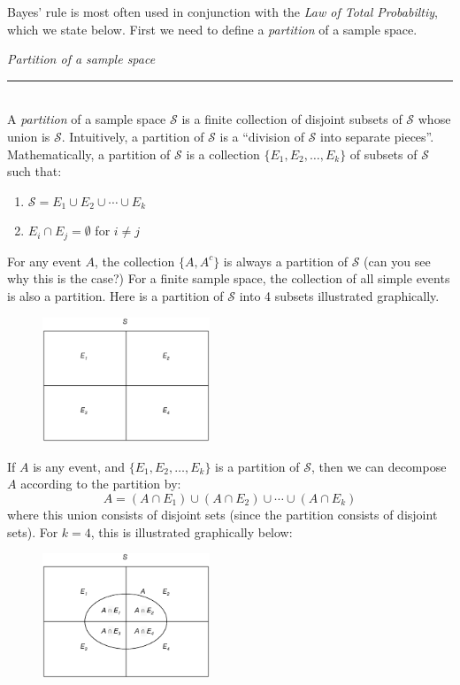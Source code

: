 \documentclass[12pt]{article}
\theoremstyle{definition}
\theoremstyle{remark}
\def\cals{{\mathcal S}}
\begin{document}
Bayes' rule is most often used in conjunction with the \emph{Law of Total Probabiltiy}, which we state below. First we need to define a \emph{partition} of a sample space.

\begin{framed}
\emph{Partition of a sample space}\\
  \rule{\dimexpr{}\fboxrule}{.1pt} \\
A \emph{partition} of a sample space $\cals$ is a finite collection of disjoint subsets of $\cals$ whose union is $\cals$. Intuitively, a partition of $\cals$ is a ``division of $\cals$ into separate pieces''. Mathematically, a partition of $\cals$ is a collection $\{E_1, E_2, \dots, E_k\}$ of subsets of $\cals$ such that:
\begin{enumerate}
\item $\cals = E_1 \cup E_2 \cup \cdots \cup E_k$
\item $E_i \cap E_j = \emptyset$ for $i \neq j$
\end{enumerate}
\end{framed}

For any event $A$, the collection $\{A, A^c\}$ is always a partition of $\cals$ (can you see why this is the case?) For a finite sample space, the collection of all simple events is also a partition. Here is a partition of $\cals$ into 4 subsets illustrated graphically.

\begin{figure}[H]
\centering
\includegraphics[width=5cm]{partition.eps}
\end{figure}

If $A$ is any event, and $\{E_1, E_2, \dots, E_k\}$ is a partition of $\cals$, then we can decompose $A$ according to the partition by:
\[
A = (A \cap E_1) \cup (A \cap E_2) \cup \cdots \cup (A \cap E_k)
\]
where this union consists of disjoint sets (since the partition consists of disjoint sets). For $k = 4$, this is illustrated graphically below:
\begin{figure}[H]
\centering
\includegraphics[width=5cm]{partition2.eps}
\end{figure}
\end{document}
